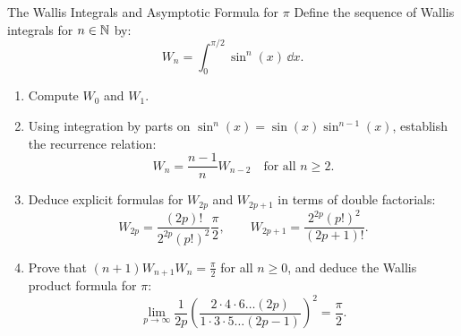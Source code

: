 \begin{exercise}{The Wallis Integrals and Asymptotic Formula for $\pi$}
Define the sequence of Wallis integrals for $n \in \mathbb{N}$ by:
\[
W_n = \int_0^{\pi/2} \sin^n(x)\,\dd x.
\]
\begin{enumerate}[leftmargin=1.5em,itemsep=2pt]
  \item Compute $W_0$ and $W_1$.
  \item Using integration by parts on $\sin^n(x) = \sin(x) \sin^{n-1}(x)$, establish the recurrence relation:
  \[
  W_n = \frac{n - 1}{n} W_{n-2} \quad \text{for all } n \ge 2.
  \]
  \item Deduce explicit formulas for $W_{2p}$ and $W_{2p+1}$ in terms of double factorials:
  \[
  W_{2p} = \frac{(2p)!}{2^{2p} (p!)^2} \frac{\pi}{2}, \qquad W_{2p+1} = \frac{2^{2p} (p!)^2}{(2p + 1)!}.
  \]
  \item Prove that $(n + 1) W_{n+1} W_n = \frac{\pi}{2}$ for all $n \ge 0$, and deduce the Wallis product formula for $\pi$:
  \[
  \lim_{p \to \infty} \frac{1}{2p} \left( \frac{2 \cdot 4 \cdot 6 \dots (2p)}{1 \cdot 3 \cdot 5 \dots (2p - 1)} \right)^2 = \frac{\pi}{2}.
  \]
\end{enumerate}
\end{exercise}

\begin{tabletworkspace}[5.5cm]
\end{tabletworkspace}

